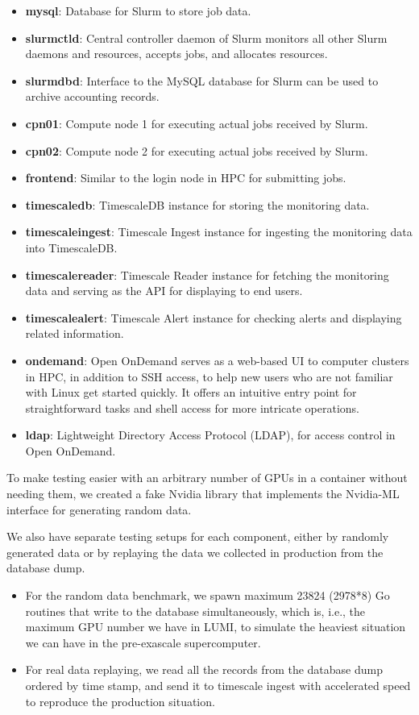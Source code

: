 \begin{itemize}
    \item \textbf{mysql}: Database for Slurm to store job data.
    \item \textbf{slurmctld}: Central controller daemon of Slurm monitors all other Slurm daemons and resources, accepts jobs, and allocates resources.
    \item \textbf{slurmdbd}: Interface to the MySQL database for Slurm can be used to archive accounting records.
    \item \textbf{cpn01}: Compute node 1 for executing actual jobs received by Slurm.
    \item \textbf{cpn02}: Compute node 2 for executing actual jobs received by Slurm.
    \item \textbf{frontend}: Similar to the login node in HPC for submitting jobs.
    \item \textbf{timescaledb}: TimescaleDB instance for storing the monitoring data.
    \item \textbf{timescaleingest}: Timescale Ingest instance for ingesting the monitoring data into TimescaleDB.
    \item \textbf{timescalereader}: Timescale Reader instance for fetching the monitoring data and serving as the API for displaying to end users.
    \item \textbf{timescalealert}: Timescale Alert instance for checking alerts and displaying related information.
    \item \textbf{ondemand}: Open OnDemand serves as a web-based UI to computer clusters in HPC, in addition to SSH access, to help new users who are not familiar with Linux get started quickly. It offers an intuitive entry point for straightforward tasks and shell access for more intricate operations.
    \item \textbf{ldap}: Lightweight Directory Access Protocol (LDAP), for access control in Open OnDemand.
\end{itemize}

To make testing easier with an arbitrary number of GPUs in a container without needing them, we created a fake Nvidia library that implements the Nvidia-ML interface for generating random data.

We also have separate testing setups for each component, either by randomly generated data or by replaying the data we collected in production from the database dump.

\begin{itemize}
    \item For the random data benchmark, we spawn maximum 23824 (2978*8) Go routines that write to the database simultaneously, which is, i.e., the maximum GPU number we have in LUMI, to simulate the heaviest situation we can have in the pre-exascale supercomputer.
    \item For real data replaying, we read all the records from the database dump ordered by time stamp, and send it to timescale ingest with accelerated speed to reproduce the production situation.
\end{itemize}

